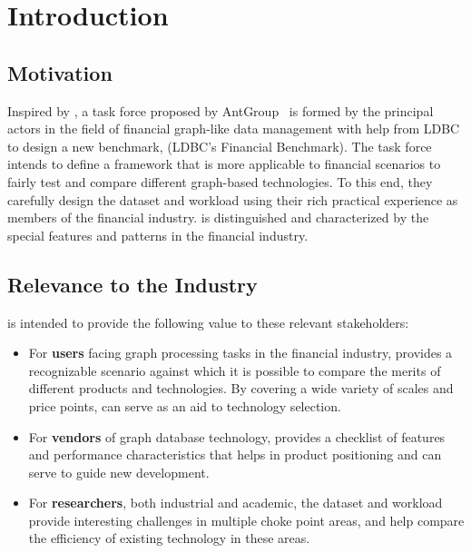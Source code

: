 \chapter{Introduction}
\label{sec:introduction}


\section{Motivation}

Inspired by \ldbcsnb, a task force proposed by AntGroup~\cite{antgroup} is
formed by the principal actors in the field of financial graph-like data
management with help from LDBC to design a new benchmark, \ldbcfinbench (LDBC's
Financial Benchmark). The task force intends to define a framework that is more
applicable to financial scenarios to fairly test and compare different graph-based
technologies. To this end, they carefully design the dataset and workload using
their rich practical experience as members of the financial industry. \ldbcfinbench
is distinguished and characterized by the special features and patterns in
the financial industry.


\section{Relevance to the Industry}

\ldbcfinbench is intended to provide the following value to these relevant
stakeholders:

\begin{itemize}
      \item For \textbf{users} facing graph processing tasks in the financial industry,
            \ldbcfinbench provides a recognizable scenario against which it is possible
            to compare the merits of different products and technologies. By covering
            a wide variety of scales and price points, \ldbcfinbench can serve as an
            aid to technology selection.
      \item For \textbf{vendors} of graph database technology, \ldbcfinbench provides a
            checklist of features and performance characteristics that helps in product
            positioning and can serve to guide new development.
      \item For \textbf{researchers}, both industrial and academic, the \ldbcfinbench
            dataset and workload provide interesting challenges in multiple choke point
            areas, and help compare the efficiency of existing technology in these
            areas.
\end{itemize}

